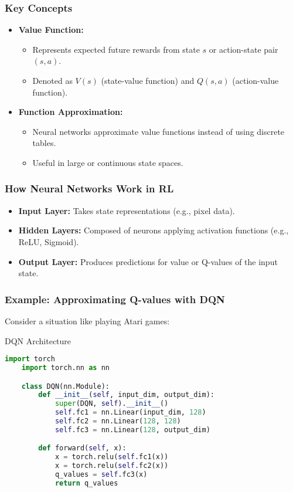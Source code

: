 \documentclass[aspectratio=169]{beamer}
\begin{document}
\begin{frame}[fragile]
    \frametitle{Key Concepts}
    \begin{itemize}
        \item \textbf{Value Function:} 
        \begin{itemize}
            \item Represents expected future rewards from state \( s \) or action-state pair \( (s, a) \).
            \item Denoted as \( V(s) \) (state-value function) and \( Q(s, a) \) (action-value function).
        \end{itemize}
        
        \item \textbf{Function Approximation:} 
        \begin{itemize}
            \item Neural networks approximate value functions instead of using discrete tables.
            \item Useful in large or continuous state spaces.
        \end{itemize} 
    \end{itemize}
\end{frame}

\begin{frame}[fragile]
    \frametitle{How Neural Networks Work in RL}
    \begin{itemize}
        \item \textbf{Input Layer:} Takes state representations (e.g., pixel data).
        \item \textbf{Hidden Layers:} Composed of neurons applying activation functions (e.g., ReLU, Sigmoid).
        \item \textbf{Output Layer:} Produces predictions for value or Q-values of the input state.
    \end{itemize}
\end{frame}

\begin{frame}[fragile]
    \frametitle{Example: Approximating Q-values with DQN}
    Consider a situation like playing Atari games:

    \begin{block}{DQN Architecture}
    \begin{lstlisting}[language=Python]
    import torch
    import torch.nn as nn

    class DQN(nn.Module):
        def __init__(self, input_dim, output_dim):
            super(DQN, self).__init__()
            self.fc1 = nn.Linear(input_dim, 128)
            self.fc2 = nn.Linear(128, 128)
            self.fc3 = nn.Linear(128, output_dim)

        def forward(self, x):
            x = torch.relu(self.fc1(x))
            x = torch.relu(self.fc2(x))
            q_values = self.fc3(x)
            return q_values
    \end{lstlisting}
    \end{block}
\end{frame}
\end{document}
